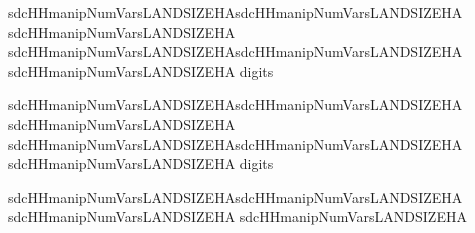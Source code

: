 \documentclass[letterpaper,10pt,english]{sphinxmanual}
\begin{document}
\def\sphinxLiteralBlockLabel{\label{\detokenize{casestudies:code918}}}
%
\begin{sphinxVerbatim}[commandchars=\\\{\},numbers=left,firstnumber=1,stepnumber=1]
sdcHHmanipNumVarsLANDSIZEHA\PYG{p}{[}sdcHHmanipNumVarsLANDSIZEHA   
                              sdcHHmanipNumVarsLANDSIZEHA\PYG{p}{]} 
             sdcHHmanipNumVarsLANDSIZEHA\PYG{p}{[}sdcHHmanipNumVarsLANDSIZEHA   
                                                 sdcHHmanipNumVarsLANDSIZEHA\PYG{p}{]}
                   digits  

sdcHHmanipNumVarsLANDSIZEHA\PYG{p}{[}sdcHHmanipNumVarsLANDSIZEHA   
                              sdcHHmanipNumVarsLANDSIZEHA\PYG{p}{]} 
             sdcHHmanipNumVarsLANDSIZEHA\PYG{p}{[}sdcHHmanipNumVarsLANDSIZEHA   
                                                 sdcHHmanipNumVarsLANDSIZEHA\PYG{p}{]}
                   digits  

sdcHHmanipNumVarsLANDSIZEHA\PYG{p}{[}sdcHHmanipNumVarsLANDSIZEHA   
sdcHHmanipNumVarsLANDSIZEHA    sdcHHmanipNumVarsLANDSIZEHA\PYG{p}{]}  


\end{sphinxVerbatim}
\end{document}

